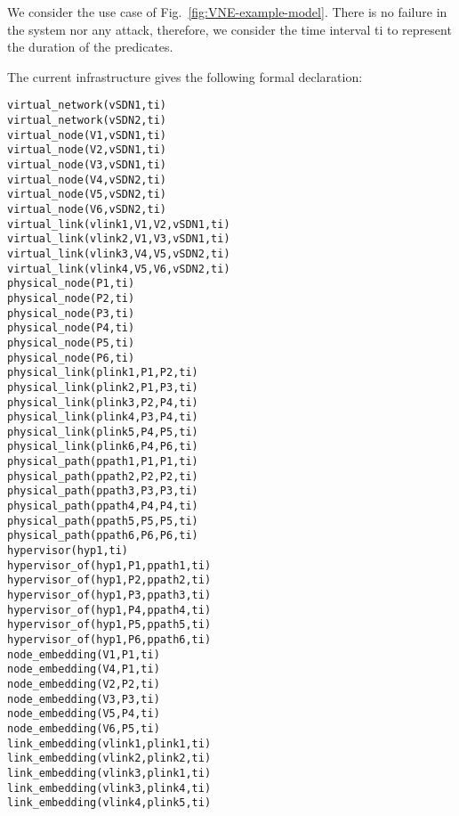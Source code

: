 We consider the use case of Fig.~\ref{fig:VNE-example-model}.
There is no failure in the system nor any attack, therefore, we consider the time interval ti to represent the duration of the predicates.



The current infrastructure gives the following formal declaration:

\begin{lstlisting}[backgroundcolor = \color{lightgray}]
virtual_network(vSDN1,ti)
virtual_network(vSDN2,ti)
virtual_node(V1,vSDN1,ti)
virtual_node(V2,vSDN1,ti)
virtual_node(V3,vSDN1,ti)
virtual_node(V4,vSDN2,ti)
virtual_node(V5,vSDN2,ti)
virtual_node(V6,vSDN2,ti)
virtual_link(vlink1,V1,V2,vSDN1,ti)
virtual_link(vlink2,V1,V3,vSDN1,ti)
virtual_link(vlink3,V4,V5,vSDN2,ti)
virtual_link(vlink4,V5,V6,vSDN2,ti)
physical_node(P1,ti)
physical_node(P2,ti)
physical_node(P3,ti)
physical_node(P4,ti)
physical_node(P5,ti)
physical_node(P6,ti)
physical_link(plink1,P1,P2,ti)
physical_link(plink2,P1,P3,ti)
physical_link(plink3,P2,P4,ti)
physical_link(plink4,P3,P4,ti)
physical_link(plink5,P4,P5,ti)
physical_link(plink6,P4,P6,ti)
physical_path(ppath1,P1,P1,ti)
physical_path(ppath2,P2,P2,ti)
physical_path(ppath3,P3,P3,ti)
physical_path(ppath4,P4,P4,ti)
physical_path(ppath5,P5,P5,ti)
physical_path(ppath6,P6,P6,ti)
hypervisor(hyp1,ti)
hypervisor_of(hyp1,P1,ppath1,ti)
hypervisor_of(hyp1,P2,ppath2,ti)
hypervisor_of(hyp1,P3,ppath3,ti)
hypervisor_of(hyp1,P4,ppath4,ti)
hypervisor_of(hyp1,P5,ppath5,ti)
hypervisor_of(hyp1,P6,ppath6,ti)
node_embedding(V1,P1,ti)
node_embedding(V4,P1,ti)
node_embedding(V2,P2,ti)
node_embedding(V3,P3,ti)
node_embedding(V5,P4,ti)
node_embedding(V6,P5,ti)
link_embedding(vlink1,plink1,ti)
link_embedding(vlink2,plink2,ti)
link_embedding(vlink3,plink1,ti)
link_embedding(vlink3,plink4,ti)
link_embedding(vlink4,plink5,ti)
\end{lstlisting}